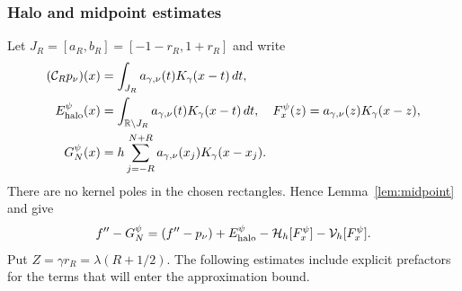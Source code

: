 \subsubsection{Halo and midpoint estimates}
Let $J_R=[a_R,b_R]=[-1-r_R,1+r_R]$ and write
\begin{align}
 (\mathcal C_Rp_\nu)(x)&=\int_{J_R}a_{\gamma,\nu}(t)K_\gamma(x-t)\,dt,\nonumber\\
 E_{\rm halo}^\psi(x)&=\int_{\mathbb R\setminus J_R}a_{\gamma,\nu}(t)K_\gamma(x-t)\,dt,
 \quad F_x^\psi(z)=a_{\gamma,\nu}(z)K_\gamma(x-z),\nonumber\\
 G_N^\psi(x)&=h\sum_{j=-R}^{N+R}a_{\gamma,\nu}(x_j)K_\gamma(x-x_j).
 \label{eq:psi-kernel-network}
\end{align}
There are no kernel poles in the chosen rectangles. Hence
Lemma~\ref{lem:midpoint} and  give
\begin{equation}
 f''-G_N^\psi=(f''-p_\nu)+E_{\rm halo}^\psi
             -\mathcal H_h[F_x^\psi]-\mathcal V_h[F_x^\psi].
 \label{eq:psi-master-decomp}
\end{equation}
Put $Z=\gamma r_R=\lambda(R+1/2)$. The following estimates include explicit
prefactors for the terms that will enter the approximation bound.


